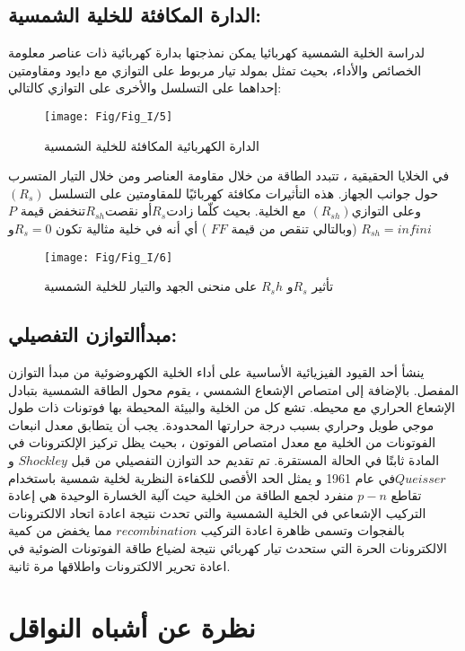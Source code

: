 \subsection{الدارة المكافئة للخلية الشمسية:}
لدراسة الخلية الشمسية كهربائيا يمكن نمذجتها بدارة كهربائية ذات عناصر معلومة الخصائص والأداء، بحيث تمثل بمولد تيار مربوط على التوازي مع دايود ومقاومتين إحداهما على التسلسل والأخرى على التوازي كالتالي: 
\begin{figure}[h!]
	\centering
	\texttt{[image: Fig/Fig\_I/5]}
	\caption{الدارة الكهربائية المكافئة للخلية الشمسية}
	\label{fig:5}
\end{figure}
\FloatBarrier
في الخلايا الحقيقية ، تتبدد الطاقة من خلال مقاومة العناصر ومن خلال التيار المتسرب حول جوانب الجهاز. هذه التأثيرات مكافئة كهربائيًا للمقاومتين على التسلسل $ (R_s) $ وعلى التوازي$ (R_{sh}) $ مع الخلية. بحيث كلّما زادت$  R_s  $أو نقصت$ R_{sh} $تنخفض قيمة $ P  $(وبالتالي تنقص من قيمة $ FF $ ) أي أنه في خلية مثالية تكون $ R_s=0  $و  $ R_{sh}=infini $
\begin{figure}[h!]
	\centering
	\texttt{[image: Fig/Fig\_I/6]}
	\caption{تأثير $ R_s $و $ R_sh $ على منحنى الجهد والتيار للخلية الشمسية}
	\label{fig:fig6}
\end{figure}
\FloatBarrier
\subsection{مبدأالتوازن التفصيلي:}
ينشأ أحد القيود الفيزيائية الأساسية على أداء الخلية الكهروضوئية من مبدأ التوازن المفصل. بالإضافة إلى امتصاص الإشعاع الشمسي ، يقوم محول الطاقة الشمسية بتبادل الإشعاع الحراري مع محيطه. تشع كل من الخلية والبيئة المحيطة بها فوتونات ذات طول موجي طويل وحراري بسبب درجة حرارتها المحدودة. يجب أن يتطابق معدل انبعاث الفوتونات من الخلية مع معدل امتصاص الفوتون ، بحيث يظل تركيز الإلكترونات في المادة ثابتًا في الحالة المستقرة. 
تم تقديم حد التوازن التفصيلي من قبل $   Shockley $ و $ Queisser  $في عام 1961 و يمثل الحد الأقصى للكفاءة النظرية لخلية شمسية باستخدام تقاطع $  p-n $ منفرد لجمع الطاقة من الخلية حيث آلية الخسارة الوحيدة هي إعادة التركيب الإشعاعي في الخلية الشمسية والتي تحدث نتيجة اعادة اتحاد الالكترونات بالفجوات وتسمى ظاهرة اعادة التركيب $ recombination $ مما يخفض من كمية الالكترونات الحرة التي ستحدث تيار كهربائي نتيجة لضياع طاقة الفوتونات الضوئية في اعادة تحرير الالكترونات واطلاقها مرة ثانية.

\section{نظرة عن أشباه النواقل}

